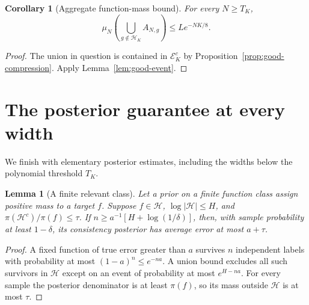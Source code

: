 \documentclass[11pt]{article}
\newtheorem{lemma}[theorem]{Lemma}\newtheorem{corollary}[theorem]{Corollary}
\theoremstyle{remark}\newtheorem{remark}[theorem]{Remark}
\begin{document}
\begin{corollary}[Aggregate function-mass bound]\label{cor:aggregate}
For every $N\geq T_K$,
\[
 \mu_N\!\left(\bigcup_{g\notin\mathcal H_K}A_{N,g}\right)
 \leq L e^{-NK/8}.
\]
\end{corollary}
\begin{proof}
The union in question is contained in $\mathcal E_K^c$ by
Proposition~\ref{prop:good-compression}. Apply Lemma~\ref{lem:good-event}.
\end{proof}

\section{The posterior guarantee at every width}
We finish with elementary posterior estimates, including the widths below
the polynomial threshold $T_K$.

\begin{lemma}[A finite relevant class]\label{lem:finite-posterior}
Let a prior on a finite function class assign positive mass to a target $f$.
Suppose $f\in\mathcal H$, $\log|\mathcal H|\leq H$, and
$\pi(\mathcal H^c)/\pi(f)\leq\tau$.
If $n\geq a^{-1}[H+\log(1/\delta)]$, then, with sample probability
at least $1-\delta$, its consistency posterior has average error at most
$a+\tau$.
\end{lemma}
\begin{proof}
A fixed function of true error greater than $a$ survives $n$ independent
labels with probability at most $(1-a)^n\leq e^{-na}$.
A union bound excludes all such survivors in $\mathcal H$ except on an
event of probability at most $e^{H-na}$.
For every sample the posterior denominator is at least $\pi(f)$, so its
mass outside $\mathcal H$ is at most $\tau$.
\end{proof}
\end{document}
